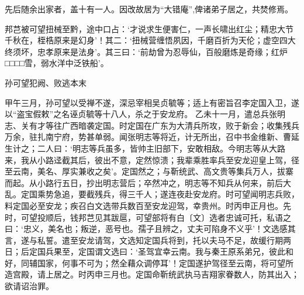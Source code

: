 \documentclass[]{article}
\begin{document}
先后随余出家者，盖十有一人。因改故居为``大错庵'',俾诸弟子居之，共焚修焉。

邦芑被可望扭械至黔，途中口占：`才说求生便害仁，一声长啸出红尘；精忠大节千秋在，桎梏原来是幻身'！其二：`扭械营缠悟夙因，千磨百折为天伦；虚空四大终须坏，忠孝原来是法身'。其三曰：`前劫曾为忍辱仙，百般磨炼是奇缘；红炉□□□□雪，弱水洋中泛铁船'。

孙可望犯阙、败逃本末

甲午三月，孙可望以受禅不遂，深忌宰相吴贞毓等；适上有密旨召李定国入卫，遂以``盗宝假敕''之名诬贞毓等十八人，杀之于安龙府。
乙未十一月，遣总兵张明志、关有才等往广西暗袭定国。时定国在广东为大清兵所攻，败于新会；收集残兵万余，驻扎南宁府，势甚单弱。闻张明志等将近，计无所出，召中书金维新、曹延生计之；二人曰：`明志等兵虽多，皆帅主旧部下，安敢相敌。今明志等从大路来，我从小路迳截其后，彼出不意，定然惊溃；我辈乘胜率兵至安龙迎皇上驾，径至云南，美名、厚实兼收之矣'。定国然之；与靳统武、高文贵等集兵万人，拔寨而起。从小路行五日，抄出明志营后；卒然冲之，明志等不知兵从何来，前后大乱。定国乘势急追，要截残兵，得三千人；遂连夜赴安龙府。时可望闻明志兵败，料定国必至安龙；疾召白文选带兵数百至安龙迎驾，幸贵州。时丙申正月也。先时，可望投顺后，钱邦芑见其跋扈，可望部将有白〔文〕选者忠诚可托，私语之曰：`忠义，美名也；叛逆，恶号也。孺子且辨之，丈夫可陷身不义乎'！文选感其言，遂与私誓。遣至安龙请驾，文选知定国兵将到，托以夫马不足，故缓行期两日；后定国兵果至，定国谓文选曰：`圣驾宜幸云南。我与秦王原系弟兄，彼此和好，同辅国家，何事不可为；然全藉众调停耳'！定国遂护驾径至云南，将可望所造宫殿，请上居之。时丙申三月也。定国命靳统武执马吉翔家眷数人，防其出入；欲请诏治罪。
\end{document}

